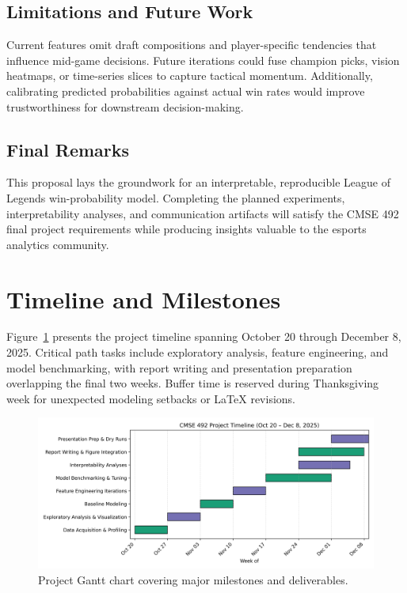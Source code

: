 \documentclass[aps,prl,preprint,groupedaddress]{revtex4-2}
\begin{document}
\subsection{Limitations and Future Work}
Current features omit draft compositions and player-specific tendencies that influence mid-game decisions. Future iterations could fuse champion picks, vision heatmaps, or time-series slices to capture tactical momentum. Additionally, calibrating predicted probabilities against actual win rates would improve trustworthiness for downstream decision-making.

\subsection{Final Remarks}
This proposal lays the groundwork for an interpretable, reproducible League of Legends win-probability model. Completing the planned experiments, interpretability analyses, and communication artifacts will satisfy the CMSE 492 final project requirements while producing insights valuable to the esports analytics community.

\section{Timeline and Milestones}
\label{sec:timeline}

Figure~\ref{fig:gantt} presents the project timeline spanning October 20 through December 8, 2025. Critical path tasks include exploratory analysis, feature engineering, and model benchmarking, with report writing and presentation preparation overlapping the final two weeks. Buffer time is reserved during Thanksgiving week for unexpected modeling setbacks or LaTeX revisions.

\begin{figure}[H]
    \centering
    \includegraphics[width=0.85\linewidth]{figures/project_timeline.png}
    \caption{Project Gantt chart covering major milestones and deliverables.}
    \label{fig:gantt}
\end{figure}
\end{document}
